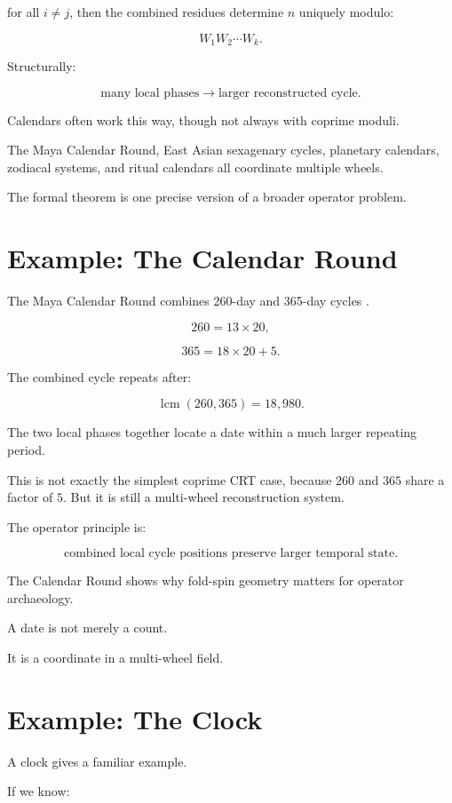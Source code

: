 \documentclass[11pt]{book}
\begin{document}
for all \(i \neq j\), then the combined residues determine \(n\) uniquely modulo:

\[
W_1W_2\cdots W_k.
\]

Structurally:

\[
\text{many local phases} \rightarrow \text{larger reconstructed cycle}.
\]

Calendars often work this way, though not always with coprime moduli.

The Maya Calendar Round, East Asian sexagenary cycles, planetary calendars, zodiacal systems, and ritual calendars all coordinate multiple wheels.

The formal theorem is one precise version of a broader operator problem.

\section{Example: The Calendar Round}

The Maya Calendar Round combines 260-day and 365-day cycles \cite{BrickerBricker2011AstronomyMayaCodices,Thompson1950MayaHieroglyphicWriting,Coe2011Maya}.

\[
260 = 13 \times 20,
\]

\[
365 = 18 \times 20 + 5.
\]

The combined cycle repeats after:

\[
\operatorname{lcm}(260,365)=18{,}980.
\]

The two local phases together locate a date within a much larger repeating period.

This is not exactly the simplest coprime CRT case, because \(260\) and \(365\) share a factor of \(5\). But it is still a multi-wheel reconstruction system.

The operator principle is:

\[
\text{combined local cycle positions preserve larger temporal state}.
\]

The Calendar Round shows why fold-spin geometry matters for operator archaeology.

A date is not merely a count.

It is a coordinate in a multi-wheel field.

\section{Example: The Clock}

A clock gives a familiar example.

If we know:
\end{document}
